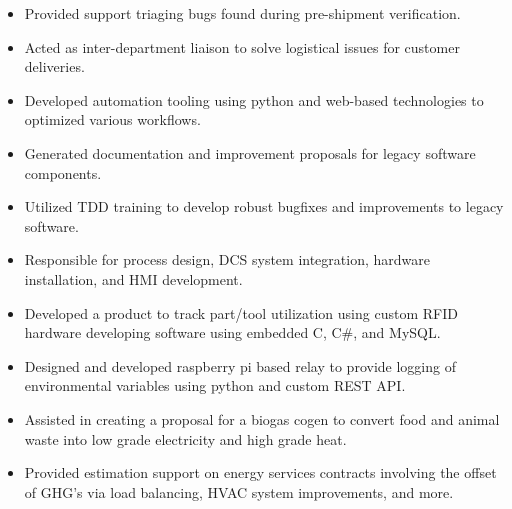 \documentclass[a4paper,ragged2e,withhyper]{altacv}
\begin{document}
\divider


\begin{itemize}
\item Provided support triaging bugs found during pre-shipment verification.\\
\item Acted as inter-department liaison to solve logistical issues for customer deliveries.\\
\item Developed automation tooling using python and web-based technologies to optimized various workflows.\\
\item Generated documentation and improvement proposals for legacy software components.\\
\item Utilized TDD training to develop robust bugfixes and improvements to legacy software.\\
\end{itemize}

\divider


\begin{itemize}
\item Responsible for process design, DCS system integration, hardware installation, and HMI development.\\
\item Developed a product to track part/tool utilization using custom RFID hardware developing software using embedded C, C\#, and MySQL.\\
\end{itemize}

\divider


\begin{itemize}
\item Designed and developed raspberry pi based relay to provide logging of environmental variables using python and custom REST API.\\
\item Assisted in creating a proposal for a biogas cogen to convert food and animal waste into low grade electricity and high grade heat.\\
\item Provided estimation support on energy services contracts involving the offset of GHG's via load balancing, HVAC system improvements, and more.\\
\end{itemize}
\end{document}
